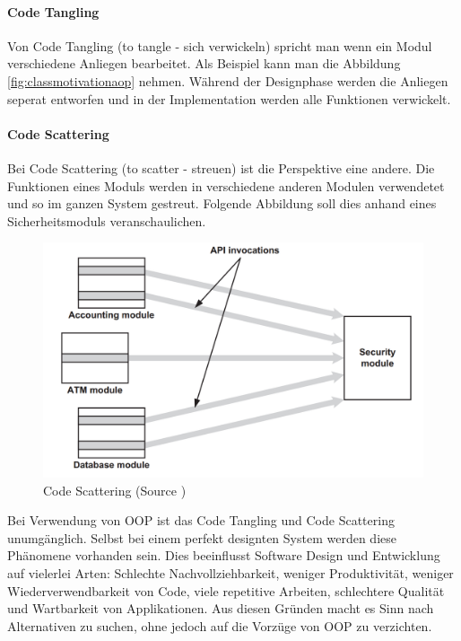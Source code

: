 \paragraph{Code Tangling}

Von Code Tangling (to tangle - sich verwickeln) spricht man wenn ein Modul verschiedene Anliegen bearbeitet. Als Beispiel kann man die Abbildung \ref{fig:classmotivationaop} nehmen. Während der Designphase werden die Anliegen seperat entworfen und in der Implementation werden alle Funktionen verwickelt.

\paragraph{Code Scattering}

Bei Code Scattering (to scatter - streuen) ist die Perspektive eine andere. Die Funktionen eines Moduls werden in verschiedene anderen Modulen verwendetet und so im ganzen System gestreut. Folgende Abbildung soll dies anhand eines Sicherheitsmoduls veranschaulichen.

\begin{figure}[H]
	\centering
		\includegraphics[scale=0.5]{bilder/motivationsCodeScattering.png}
	\caption{Code Scattering (Source \cite[p~54]{laddad:aspectj})}
	\label{fig:motivationcs}
\end{figure}

Bei Verwendung von OOP ist das Code Tangling und Code Scattering unumgänglich. Selbst bei einem perfekt designten System werden diese Phänomene vorhanden sein. Dies beeinflusst Software Design und Entwicklung auf vielerlei Arten: Schlechte Nachvollziehbarkeit, weniger Produktivität, weniger Wiederverwendbarkeit von Code, viele repetitive Arbeiten, schlechtere Qualität und Wartbarkeit von Applikationen. Aus diesen Gründen macht es Sinn nach Alternativen zu suchen, ohne jedoch auf die Vorzüge von OOP zu verzichten.

